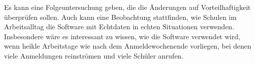 Es kann eine Folgeuntersuchung geben, die die Änderungen auf Vorteilhaftigkeit überprüfen sollen.
Auch kann eine Beobachtung stattfinden, wie Schulen im Arbeitsalltag die Software mit Echtdaten in echten Situationen verwenden. Insbesondere wäre es interessant zu wissen, wie die Software verwendet wird, wenn heikle Arbeitstage wie nach dem Anmeldewochenende vorliegen, bei denen viele Anmeldungen reinströmen und viele Schüler anrufen.